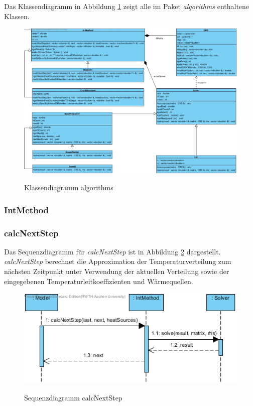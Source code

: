 Das Klassendiagramm in Abbildung \ref{Klassendiagramm algorithms} zeigt alle im Paket \emph{algorithms} enthaltene Klassen.

\begin{figure}[H]
	\centering
	\includegraphics[scale=.52]{Bilder/algorithms.jpg}\\
	\caption{Klassendiagramm algorithms}
	\label{Klassendiagramm algorithms}
\end{figure}

\subsubsection{IntMethod}

\subsubsection*{calcNextStep}

Das Sequenzdiagramm für \emph{calcNextStep} ist in Abbildung \ref{Sequenzdiagramm calcNextStep} dargestellt. \emph{calcNextStep} berechnet die Approximation der Temperaturverteilung zum nächsten Zeitpunkt unter Verwendung der aktuellen Verteilung sowie der eingegebenen Temperaturleitkoeffizienten und Wärmequellen.

\begin{figure}[H]
	\centering
	\includegraphics[scale=.6]{Bilder/IntMethod__calcNextStep().jpg}\\
	\caption{Sequenzdiagramm calcNextStep}
	\label{Sequenzdiagramm calcNextStep}
\end{figure}

